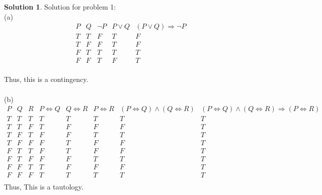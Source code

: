 \documentclass{article}
\theoremstyle{definition}
\newtheorem*{solution}{Solution}
\begin{document}
\begin{solution} Solution for problem 1:\\

(a)
\begin{displaymath}
\begin{array}{ c|c|c|c|c }
P & Q & \neg P & P \vee Q & (P \vee Q) \Rightarrow \neg P  \\ %
\hline %
T & T & F & T & F\\
T & F & F & T & F\\
F & T & T & T & T\\
F & F & T & F & T\\
\end{array}
\end{displaymath}

Thus, this is a contingency.\\\\


(b)
\begin{displaymath}
\begin{array}{ c|c|c|c|c|c|c|c }
P & Q & R & P \Leftrightarrow Q & Q \Leftrightarrow R & P \Leftrightarrow R &  (P \Leftrightarrow Q) \wedge (Q \Leftrightarrow R) &  (P \Leftrightarrow Q) \wedge (Q \Leftrightarrow R) \Rightarrow (P \Leftrightarrow R)  \\ %
\hline %
T & T & T & T & T & T & T & T\\
T & T & F & T & F & F & F & T\\
T & F & T & F & F & T & T & T\\
T & F & F & F & T & F & F & T\\
F & T & T & F & T & F & F & T\\
F & T & F & F & F & T & T & T\\
F & F & T & T & F & F & F & T\\
F & F & F & T & T & T & T & T\\
\end{array}
\end{displaymath}
Thus, This is a tautology.\\\\



\end{solution}
\end{document}

